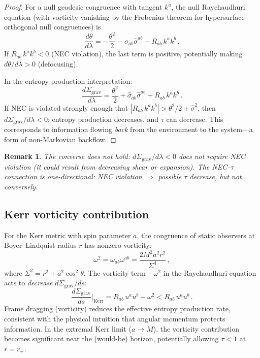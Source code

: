 \documentclass[aps,prd,preprint,superscriptaddress,longbibliography]{revtex4-2}
\newtheorem*{remark}{Remark}
\newcommand{\tauasym}{\tau}
\newcommand{\Sgrav}{\Sigma_{\mathrm{grav}}}
\begin{document}
\begin{proof}
For a null geodesic congruence with tangent $k^a$, the null
Raychaudhuri equation (with vorticity vanishing by the Frobenius
theorem for hypersurface-orthogonal null congruences) is
\begin{equation}
  \frac{d\theta}{d\lambda} = -\frac{\theta^2}{2}
  - \hat{\sigma}_{ab}\hat{\sigma}^{ab} - R_{ab}\,k^a k^b\,.
  \label{eq:null_Raychaudhuri}
\end{equation}
If $R_{ab}\,k^a k^b < 0$ (NEC violation), the last term is positive,
potentially making $d\theta/d\lambda > 0$ (defocusing).

In the entropy production interpretation:
\begin{equation}
  \frac{d\Sgrav}{d\lambda} = \frac{\theta^2}{2}
  + \hat{\sigma}_{ab}\hat{\sigma}^{ab} + R_{ab}\,k^a k^b\,.
  \label{eq:null_dSigma}
\end{equation}
If NEC is violated strongly enough that
$|R_{ab}\,k^a k^b| > \theta^2/2 + \hat{\sigma}^2$, then
$d\Sgrav/d\lambda < 0$: entropy production decreases, and $\tauasym$
can decrease.  This corresponds to information flowing \emph{back}
from the environment to the system---a form of non-Markovian
backflow.
\end{proof}

\begin{remark}
The converse does not hold: $d\Sgrav/d\lambda < 0$ does not require
NEC violation (it could result from decreasing shear or expansion).
The NEC--$\tauasym$ connection is one-directional:
NEC violation $\Rightarrow$ possible $\tauasym$ decrease, but not
conversely.
\end{remark}

\subsection{Kerr vorticity contribution}

For the Kerr metric with spin parameter $a$, the congruence of
static observers at Boyer--Lindquist radius $r$ has nonzero vorticity:
\begin{equation}
  \omega^2 = \omega_{ab}\omega^{ab}
  = \frac{2M^2 a^2 r^2}{\Sigma^4}\,,
  \label{eq:Kerr_vorticity}
\end{equation}
where $\Sigma^2 = r^2 + a^2\cos^2\theta$.  The vorticity term
$-\omega^2$ in the Raychaudhuri equation acts to \emph{decrease}
$d\Sgrav/ds$:
\begin{equation}
  \frac{d\Sgrav}{ds}\bigg|_{\mathrm{Kerr}} = R_{ab}\,u^a u^b - \omega^2
  < R_{ab}\,u^a u^b\,.
  \label{eq:Kerr_dSigma}
\end{equation}
Frame dragging (vorticity) reduces the effective entropy production
rate, consistent with the physical intuition that angular momentum
protects information.  In the extremal Kerr limit ($a \to M$), the
vorticity contribution becomes significant near the (would-be)
horizon, potentially allowing $\tauasym < 1$ at $r = r_+$.
\end{document}
